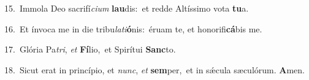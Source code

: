 {\numbfont\textcolor{\numbcolor}{15.}}~Immola Deo sacrifí\-\textit{ci}\-\textit{um} \textbf{lau}\-dis:~\star et redde Altíssimo vota \textbf{tu}\-a.\par
{\numbfont\textcolor{\numbcolor}{16.}}~Et ínvoca me in die tribu\-\textit{la}\-\textit{ti}\textbf{ó}nis:~\star éruam te, et honorifi\-\textbf{cá}\-bis me.\par
{\numbfont\textcolor{\numbcolor}{17.}}~Glória Pa\-\textit{tri}\-, \textit{et} \textbf{Fí}\-lio,~\star et Spirítui \textbf{Sanc}\-to.\par
{\numbfont\textcolor{\numbcolor}{18.}}~Sicut erat in princípio, et \textit{nunc}\-, \textit{et} \textbf{sem}\-per,~\star et in sǽcula sæculórum. \textbf{A}\-men.\par
